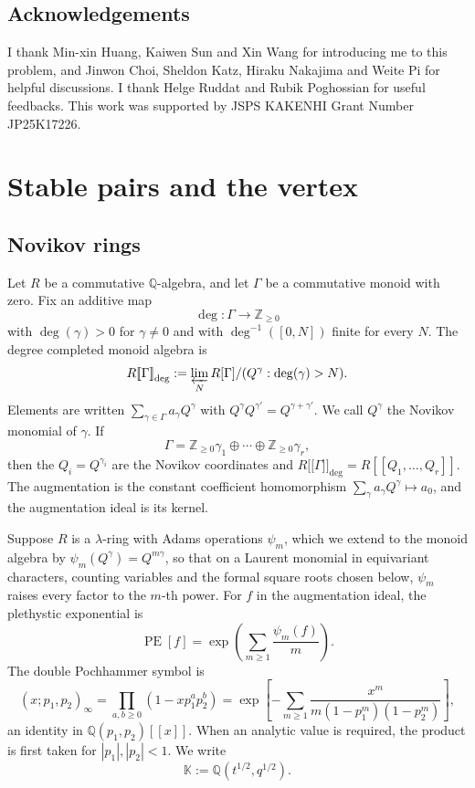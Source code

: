 \documentclass{amsart}
\theoremstyle{definition}
\numberwithin{equation}{section}
\newcommand{\Q}{\mathbb Q}
\newcommand{\Z}{\mathbb Z}
\newcommand{\PE}{\operatorname{PE}}
\newcommand{\K}{\mathbb K}
\newcommand{\llbracket}{\mathopen{[\![}}
\newcommand{\rrbracket}{\mathclose{]\!]}}
\begin{document}
\subsection*{Acknowledgements}
I thank Min-xin Huang, Kaiwen Sun and Xin Wang for introducing me to this problem, and Jinwon Choi, Sheldon Katz, Hiraku Nakajima and Weite Pi for helpful discussions.  I thank Helge Ruddat and Rubik Poghossian for useful feedbacks.  This work was supported by JSPS KAKENHI Grant Number JP25K17226.

\section{Stable pairs and the vertex}
\label{sec:PT-refined-vertex}

\subsection{Novikov rings}
Let \(R\) be a commutative \(\Q\)-algebra, and let \(\Gamma\) be a commutative monoid with zero.  Fix an additive map
\[
 \deg:\Gamma\to\Z_{\geq0}
\]
with \(\deg(\gamma)>0\) for \(\gamma\neq0\) and with \(\deg^{-1}([0,N])\) finite for every \(N\).  The degree completed monoid algebra is
\begin{equation}
 R\llbracket\Gamma\rrbracket_{\deg}
 :=\varprojlim_N
 R[\Gamma]/(Q^\gamma:\deg(\gamma)>N).
\label{eq:completed-monoid-algebra-general}
\end{equation}
Elements are written \(\sum_{\gamma\in\Gamma}a_\gamma Q^\gamma\) with \(Q^\gamma Q^{\gamma'}=Q^{\gamma+\gamma'}\).  We call \(Q^\gamma\) the Novikov monomial of \(\gamma\).  If
\[
 \Gamma=\Z_{\geq0}\gamma_1\oplus\cdots\oplus\Z_{\geq0}\gamma_r,
\]
then the \(Q_i=Q^{\gamma_i}\) are the Novikov coordinates and \(R\llbracket\Gamma\rrbracket_{\deg}=R[[Q_1,\ldots,Q_r]]\).  The augmentation is the constant coefficient homomorphism \(\sum_\gamma a_\gamma Q^\gamma\mapsto a_0\), and the augmentation ideal is its kernel.

Suppose \(R\) is a \(\lambda\)-ring with Adams operations \(\psi_m\), which we extend to the monoid algebra by \(\psi_m(Q^\gamma)=Q^{m\gamma}\), so that on a Laurent monomial in equivariant characters, counting variables and the formal square roots chosen below, \(\psi_m\) raises every factor to the \(m\)-th power.  For \(f\) in the augmentation ideal, the plethystic exponential is
\begin{equation}
 \PE[f]
 =\exp\left(\sum_{m\geq1}\frac{\psi_m(f)}m\right).
\label{eq:global-plethystic-exponential}
\end{equation}
The double Pochhammer symbol is
\begin{equation}
 (x;p_1,p_2)_\infty
 =\prod_{a,b\geq0}(1-xp_1^ap_2^b)
 =\exp\left[-\sum_{m\geq1}
 \frac{x^m}{m(1-p_1^m)(1-p_2^m)}\right],
\label{eq:global-double-Pochhammer}
\end{equation}
an identity in \(\Q(p_1,p_2)[[x]]\).  When an analytic value is required, the product is first taken for \(|p_1|,|p_2|<1\).  We write
\[
 \K:=\Q(t^{1/2},q^{1/2}).
\]
\end{document}
